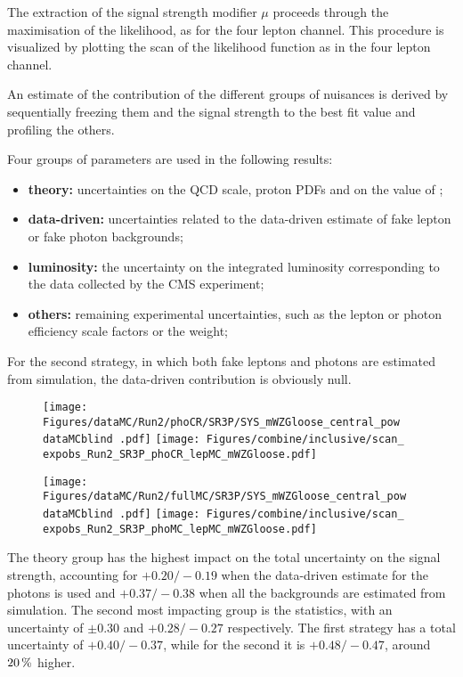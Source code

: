 The extraction of the signal strength modifier $\mu$ proceeds through the maximisation of the likelihood,
as for the four lepton channel.
This procedure is visualized by plotting the scan of the likelihood function as in the four lepton channel.

An estimate of the contribution of the different groups of nuisances is derived
by sequentially freezing them and the signal strength to the best fit value
and profiling the others.

Four groups of parameters are used in the following results:
\begin{itemize}
\item \textbf{theory:} uncertainties on the QCD scale, proton PDFs and on the value of \alpS;
\item \textbf{data-driven:} uncertainties related to the data-driven estimate of fake lepton or fake photon backgrounds;
\item \textbf{luminosity:} the uncertainty on the integrated luminosity corresponding to the data collected by the CMS experiment;
\item \textbf{others:} remaining experimental uncertainties, such as the lepton or photon efficiency scale factors or the \pileup{} weight;
\end{itemize}

For the second strategy, in which both fake leptons and photons are estimated from simulation,
the data-driven contribution is obviously null.

\begin{figure}
  \centering
  \texttt{[image: Figures/dataMC/Run2/phoCR/SR3P/SYS\_mWZGloose\_central\_pow\\dataMCblind .pdf]}
  \hfill
  \texttt{[image: Figures/combine/inclusive/scan\_\\expobs\_Run2\_SR3P\_phoCR\_lepMC\_mWZGloose.pdf]}
  \caption{}
  \label{fig:scan_Run2_SR3P_phoCR_lepMC_mWZGloose}
\end{figure}

\begin{figure}
  \centering
  \texttt{[image: Figures/dataMC/Run2/fullMC/SR3P/SYS\_mWZGloose\_central\_pow\\dataMCblind .pdf]}
  \hfill
  \texttt{[image: Figures/combine/inclusive/scan\_\\expobs\_Run2\_SR3P\_phoMC\_lepMC\_mWZGloose.pdf]}
  \caption{}
  \label{fig:scan_Run2_SR4P_phoMC_lepMC_mWZGloose}
\end{figure}

The theory group has the highest impact on the total uncertainty on the signal strength,
accounting for $+0.20/-0.19$ when the data-driven estimate for the \nonprompt photons is used
and $+0.37/-0.38$ when all the backgrounds are estimated from simulation.
The second most impacting group is the statistics, with an uncertainty of
$\pm 0.30$ and $+0.28/-0.27$ respectively.
The first strategy has a total uncertainty of $+0.40/-0.37$,
while for the second it is $+0.48/-0.47$,
around $20\usep\%$ higher.
